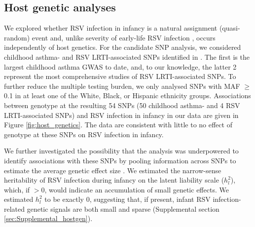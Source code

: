 \documentclass{article} %
\begin{document}
\subsection{Host genetic analyses}
We explored whether RSV infection in infancy is a natural assignment (quasi-random) event and, unlike severity of early-life RSV infection
\citep{larkin2015genes},
 occurs independently of host genetics. 
 For the candidate SNP analysis, we considered childhood asthma- and RSV
LRTI-associated SNPs identified in 
\citet{pividori2019shared, janssen2007genetic, pasanen2017genome}. 
The first is the largest childhood asthma GWAS to date, and, to our knowledge, the latter 2 represent the most comprehensive studies of RSV LRTI-associated  SNPs. 
To further reduce the multiple testing burden, we only analysed SNPs with MAF $\ge$ 0.1 in at least one of the White, Black, or Hispanic ethnicity groups. 
Associations between genotype at the resulting 54 SNPs (50 childhood asthma- and 4 RSV LRTI-associated SNPs) and RSV infection in infancy in our data are given in Figure
\ref{fig:host_genetics}. 
The data are consistent with little to no effect of genotype at these SNPs on RSV infection in infancy.

We further investigated the possibility that the analysis was underpowered to identify associations with these SNPs by pooling information across SNPs to estimate the average genetic effect 
size
\citep{golan2014measuring}.
We estimated the narrow-sense heritability of RSV infection during infancy on the latent liability scale
($h_l^2$), which, if $> 0$, would indicate an accumulation of small genetic effects. 
We estimated $h_l^2$ to be exactly 0, suggesting that, if present, infant RSV infection-related genetic signals are both small and sparse
(Supplemental section \ref{sec:Supplemental_hostgen}).
\end{document}
